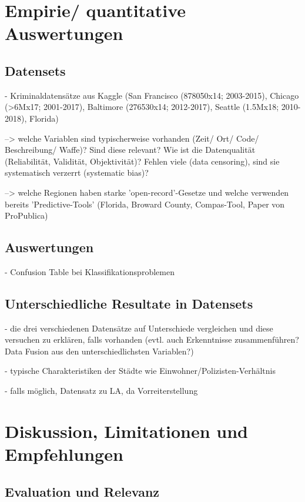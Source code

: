 \documentclass[a4paper,12pt,parskip,bibtotoc,liststotoc]{article}
\begin{document}
\newpage
\section{Empirie/ quantitative Auswertungen}

\subsection{Datensets}

- Kriminaldatensätze aus Kaggle (San Francisco (878050x14; 2003-2015), Chicago (>6Mx17; 2001-2017), Baltimore (276530x14; 2012-2017), Seattle (1.5Mx18; 2010-2018), Florida)


--> welche Variablen sind typischerweise vorhanden (Zeit/ Ort/ Code/ Beschreibung/ Waffe)? Sind diese relevant? Wie ist die Datenqualität (Reliabilität, Validität, Objektivität)? Fehlen viele (data censoring), sind sie systematisch verzerrt (systematic bias)?

--> welche Regionen haben starke 'open-record'-Gesetze und welche verwenden bereits 'Predictive-Tools' (Florida,  Broward County, Compas-Tool, Paper von ProPublica)




\subsection{Auswertungen}  

- Confusion Table bei Klassifikationsproblemen

\subsection{Unterschiedliche Resultate in Datensets} 

- die drei verschiedenen Datensätze auf Unterschiede vergleichen und diese versuchen zu erklären, falls vorhanden (evtl. auch Erkenntnisse zusammenführen? Data Fusion aus den unterschiedlichsten Variablen?)

- typische Charakteristiken der Städte wie Einwohner/Polizisten-Verhältnis

- falls möglich, Datensatz zu LA, da Vorreiterstellung


\newpage
\section{Diskussion, Limitationen und Empfehlungen}

\subsection{Evaluation und Relevanz}
\end{document}
